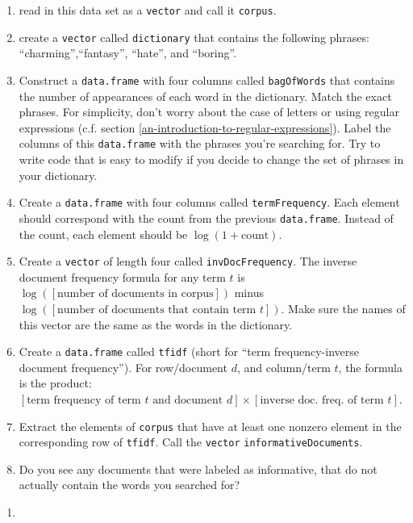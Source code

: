 \documentclass[12pt,krantz2]{krantz}
\providecommand{\tightlist}{%
  \setlength{\itemsep}{0pt}\setlength{\parskip}{0pt}}
\begin{document}
\begin{enumerate}
\def\labelenumi{\alph{enumi})}
\tightlist
\item
  read in this data set as a \texttt{vector} and call it \texttt{corpus}.
\item
  create a \texttt{vector} called \texttt{dictionary} that contains the following phrases: ``charming'',``fantasy'', ``hate'', and ``boring''.
\item
  Construct a \texttt{data.frame} with four columns called \texttt{bagOfWords} that contains the number of appearances of each word in the dictionary. Match the exact phrases. For simplicity, don't worry about the case of letters or using regular expressions (c.f. section \ref{an-introduction-to-regular-expressions}). Label the columns of this \texttt{data.frame} with the phrases you're searching for. Try to write code that is easy to modify if you decide to change the set of phrases in your dictionary.
\item
  Create a \texttt{data.frame} with four columns called \texttt{termFrequency}. Each element should correspond with the count from the previous \texttt{data.frame}. Instead of the count, each element should be \(\log(1 + \text{count})\).
\item
  Create a \texttt{vector} of length four called \texttt{invDocFrequency}. The inverse document frequency formula for any term \(t\) is \(\log([\text{number of documents in corpus}])\) minus \(\log([\text{number of documents that contain term } t])\). Make sure the names of this vector are the same as the words in the dictionary.
\item
  Create a \texttt{data.frame} called \texttt{tfidf} (short for ``term frequency-inverse document frequency''). For row/document \(d\), and column/term \(t\), the formula is the product: \([\text{term frequency of term } t \text{ and document } d ] \times [\text{inverse doc. freq. of term } t]\).
\item
  Extract the elements of \texttt{corpus} that have at least one nonzero element in the corresponding row of \texttt{tfidf}. Call the \texttt{vector} \texttt{informativeDocuments}.
\item
  Do you see any documents that were labeled as informative, that do not actually contain the words you searched for?
\end{enumerate}

\begin{enumerate}
\def\labelenumi{\arabic{enumi}.}
\setcounter{enumi}{1}
\item
\end{enumerate}
\end{document}
